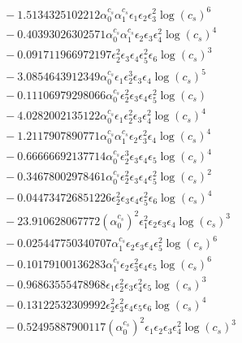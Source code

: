 \documentclass[10pt]{article}
\begin{document}
\begin{align*}
&{}  - 1.5134325102212 \alpha_{0}^{c_s} \alpha_{1}^{c_s} \epsilon_{1} \epsilon_{2} \epsilon_{3}^{2} \log{\left(c_{s} \right)}^{6} \\
&{}  - 0.40393026302571 \alpha_{0}^{c_s} \alpha_{1}^{c_s} \epsilon_{2} \epsilon_{3} \epsilon_{4}^{2} \log{\left(c_{s} \right)}^{4} \\
&{}  - 0.091711966972197 \epsilon_{2}^{2} \epsilon_{3} \epsilon_{4} \epsilon_{5}^{2} \epsilon_{6} \log{\left(c_{s} \right)}^{3} \\
&{}  - 3.0854643912349 \alpha_{0}^{c_s} \epsilon_{1} \epsilon_{2}^{3} \epsilon_{3} \epsilon_{4} \log{\left(c_{s} \right)}^{5} \\
&{}  - 0.11106979298066 \alpha_{0}^{c_s} \epsilon_{2}^{2} \epsilon_{3} \epsilon_{4} \epsilon_{5}^{2} \log{\left(c_{s} \right)} \\
&{}  - 4.0282002135122 \alpha_{0}^{c_s} \epsilon_{1} \epsilon_{2}^{2} \epsilon_{3} \epsilon_{4}^{2} \log{\left(c_{s} \right)}^{4} \\
&{}  - 1.2117907890771 \alpha_{0}^{c_s} \alpha_{1}^{c_s} \epsilon_{2} \epsilon_{3}^{2} \epsilon_{4} \log{\left(c_{s} \right)}^{4} \\
&{}  - 0.66666692137714 \alpha_{0}^{c_s} \epsilon_{2}^{3} \epsilon_{3} \epsilon_{4} \epsilon_{5} \log{\left(c_{s} \right)}^{4} \\
&{}  - 0.34678002978461 \alpha_{0}^{c_s} \epsilon_{2}^{2} \epsilon_{3} \epsilon_{4} \epsilon_{5}^{2} \log{\left(c_{s} \right)}^{2} \\
&{}  - 0.044734726851226 \epsilon_{2}^{2} \epsilon_{3} \epsilon_{4} \epsilon_{5}^{2} \epsilon_{6} \log{\left(c_{s} \right)}^{4} \\
&{}  - 23.910628067772 \left(\alpha_{0}^{c_s}\right)^{2} \epsilon_{1}^{2} \epsilon_{2} \epsilon_{3} \epsilon_{4} \log{\left(c_{s} \right)}^{3} \\
&{}  - 0.025447750340707 \alpha_{1}^{c_s} \epsilon_{2} \epsilon_{3} \epsilon_{4} \epsilon_{5}^{2} \log{\left(c_{s} \right)}^{6} \\
&{}  - 0.10179100136283 \alpha_{1}^{c_s} \epsilon_{2} \epsilon_{3}^{2} \epsilon_{4} \epsilon_{5} \log{\left(c_{s} \right)}^{6} \\
&{}  - 0.96863555478968 \epsilon_{1} \epsilon_{2}^{2} \epsilon_{3} \epsilon_{4}^{2} \epsilon_{5} \log{\left(c_{s} \right)}^{3} \\
&{}  - 0.13122532309992 \epsilon_{2}^{2} \epsilon_{3}^{2} \epsilon_{4} \epsilon_{5} \epsilon_{6} \log{\left(c_{s} \right)}^{4} \\
&{}  - 0.52495887900117 \left(\alpha_{0}^{c_s}\right)^{2} \epsilon_{1} \epsilon_{2} \epsilon_{3} \epsilon_{4}^{2} \log{\left(c_{s} \right)}^{3} \\

\end{align*}
\end{document}
